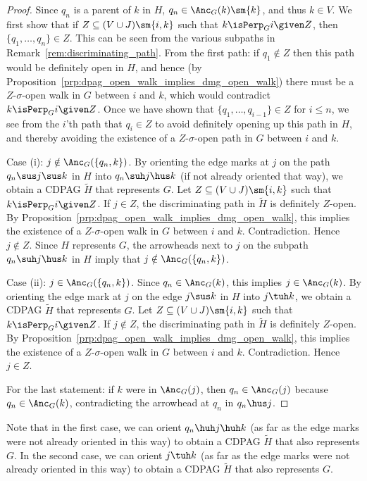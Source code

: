 \begin{proof}
  Since $q_n$ is a parent of $k$ in $H$, $q_n \in \Anc_G(k) \sm \{k\}$, and thus $k \in V$.
  We first show that if $Z \subseteq (V \cup J) \sm \{i,k\}$ such that $k \isPerp_G i \given Z$, then $\{q_1, \dots, q_n\} \in Z$.
  This can be seen from the various subpaths in Remark~\ref{rem:discriminating_path}.
  From the first path: if $q_1 \notin Z$ then this path would be definitely open in $H$, and hence (by Proposition~\ref{prp:dpag_open_walk_implies_dmg_open_walk}) there must be a $Z$-$\sigma$-open walk in $G$ between $i$ and $k$, which would contradict $k \isPerp_G i \given Z$.
  Once we have shown that $\{q_1, \dots, q_{i-1}\} \in Z$ for $i \le n$, we see from the $i$'th path that $q_i \in Z$ to avoid definitely opening up this path in $H$, and thereby avoiding the existence of a $Z$-$\sigma$-open path in $G$ between $i$ and $k$.

  Case (i): $j \notin \Anc_G(\{q_n,k\})$.
  By orienting the edge marks at $j$ on the path $q_n \sus j \sus k$ in $H$ into $q_n \suh j \hus k$ (if not already oriented that way), we obtain a CDPAG $\tilde{H}$ that represents $G$.
  Let $Z \subseteq (V \cup J) \sm \{i,k\}$ such that $k \isPerp_G i \given Z$. 
  If $j \in Z$, the discriminating path in $\tilde{H}$ is definitely $Z$-open.
  By Proposition~\ref{prp:dpag_open_walk_implies_dmg_open_walk}, this implies the existence of a $Z$-$\sigma$-open walk in $G$ between $i$ and $k$.
  Contradiction. 
  Hence $j \notin Z$.
  Since $H$ represents $G$, the arrowheads next to $j$ on the subpath $q_n \suh j \hus k$ in $H$ imply that $j \notin \Anc_G(\{q_n,k\})$.

  Case (ii): $j \in \Anc_G(\{q_n,k\})$. 
  Since $q_n \in \Anc_G(k)$, this implies $j \in \Anc_G(k)$.
  By orienting the edge mark at $j$ on the edge $j \sus k$ in $H$ into $j \tuh k$, we obtain a CDPAG $\tilde{H}$ that represents $G$.
  Let $Z \subseteq (V \cup J) \sm \{i,k\}$ such that $k \isPerp_G i \given Z$. 
  If $j \notin Z$, the discriminating path in $\tilde{H}$ is definitely $Z$-open.
  By Proposition~\ref{prp:dpag_open_walk_implies_dmg_open_walk}, this implies the existence of a $Z$-$\sigma$-open walk in $G$ between $i$ and $k$.
  Contradiction. 
  Hence $j \in Z$.

  For the last statement: if $k$ were in $\Anc_G(j)$, then $q_n \in \Anc_G(j)$ because $q_n \in \Anc_G(k)$, contradicting the arrowhead at $q_n$ in $q_n \hus j$.
\end{proof}
Note that in the first case, we can orient $q_n \huh j \huh k$ (as far as the edge marks were not already oriented in this way) to obtain a CDPAG $\tilde{H}$ that also represents $G$. 
In the second case, we can orient $j \tuh k$ (as far as the edge marks were not already oriented in this way) to obtain a CDPAG $\tilde{H}$ that also represents $G$.

